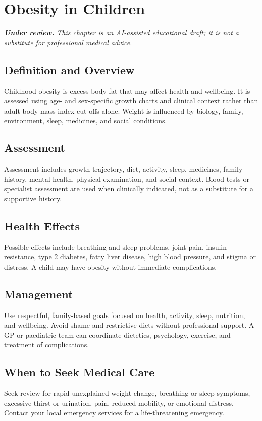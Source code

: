 \chapter{Obesity in Children}

\medskip
\noindent\textit{\textbf{Under review.} This chapter is an AI-assisted educational draft; it is not a substitute for professional medical advice.}

\section*{Definition and Overview}
Childhood obesity is excess body fat that may affect health and wellbeing. It is assessed using age- and sex-specific growth charts and clinical context rather than adult body-mass-index cut-offs alone. Weight is influenced by biology, family, environment, sleep, medicines, and social conditions.

\section*{Assessment}
Assessment includes growth trajectory, diet, activity, sleep, medicines, family history, mental health, physical examination, and social context. Blood tests or specialist assessment are used when clinically indicated, not as a substitute for a supportive history.

\section*{Health Effects}
Possible effects include breathing and sleep problems, joint pain, insulin resistance, type 2 diabetes, fatty liver disease, high blood pressure, and stigma or distress. A child may have obesity without immediate complications.

\section*{Management}
Use respectful, family-based goals focused on health, activity, sleep, nutrition, and wellbeing. Avoid shame and restrictive diets without professional support. A GP or paediatric team can coordinate dietetics, psychology, exercise, and treatment of complications.

\section*{When to Seek Medical Care}
Seek review for rapid unexplained weight change, breathing or sleep symptoms, excessive thirst or urination, pain, reduced mobility, or emotional distress. Contact your local emergency services for a life-threatening emergency.


